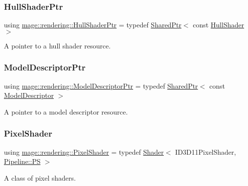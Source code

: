 \subsubsection{\texorpdfstring{Hull\+Shader\+Ptr}{HullShaderPtr}}
{\footnotesize\ttfamily using \mbox{\hyperlink{namespacemage_1_1rendering_a6f33b2e1ea7f2ae3824dc7fb6875c655}{mage\+::rendering\+::\+Hull\+Shader\+Ptr}} = typedef \mbox{\hyperlink{namespacemage_a1e01ae66713838a7a67d30e44c67703e}{Shared\+Ptr}}$<$ const \mbox{\hyperlink{namespacemage_1_1rendering_aa133f36cd1a81c87eedf962270a12f48}{Hull\+Shader}} $>$}

A pointer to a hull shader resource. \mbox{\label{namespacemage_1_1rendering_a07260934fd7cb48a210873ae73e62911}} 
\subsubsection{\texorpdfstring{Model\+Descriptor\+Ptr}{ModelDescriptorPtr}}
{\footnotesize\ttfamily using \mbox{\hyperlink{namespacemage_1_1rendering_a07260934fd7cb48a210873ae73e62911}{mage\+::rendering\+::\+Model\+Descriptor\+Ptr}} = typedef \mbox{\hyperlink{namespacemage_a1e01ae66713838a7a67d30e44c67703e}{Shared\+Ptr}}$<$ const \mbox{\hyperlink{classmage_1_1rendering_1_1_model_descriptor}{Model\+Descriptor}} $>$}

A pointer to a model descriptor resource. \mbox{\label{namespacemage_1_1rendering_a19905114913398d5073148f6c416e1b7}} 
\subsubsection{\texorpdfstring{Pixel\+Shader}{PixelShader}}
{\footnotesize\ttfamily using \mbox{\hyperlink{namespacemage_1_1rendering_a19905114913398d5073148f6c416e1b7}{mage\+::rendering\+::\+Pixel\+Shader}} = typedef \mbox{\hyperlink{classmage_1_1rendering_1_1_shader}{Shader}}$<$ I\+D3\+D11\+Pixel\+Shader, \mbox{\hyperlink{structmage_1_1rendering_1_1_pipeline_1_1_p_s}{Pipeline\+::\+PS}} $>$}

A class of pixel shaders. \mbox{\label{namespacemage_1_1rendering_af03d922b228ee9c8542baaa2ecc9f259}} 
